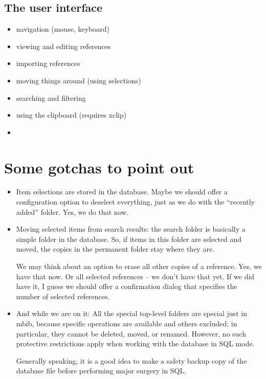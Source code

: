 \documentclass[10pt]{article}
\begin{document}
%
%


\subsection{The user interface}

\begin{itemize}
\item navigation (mouse, keyboard)
\item viewing and editing references
\item importing references
\item moving things around (using selections)
\item searching and filtering
\item using the clipboard (requires xclip)
\item 
\end{itemize}

\section*{Some gotchas to point out}

\begin{itemize}
\item Item selections are stored in the database. Maybe we should offer a configuration option to deselect everything, just as we do with the ``recently added'' folder. Yes, we do that now. 

\item Moving selected items from search results: the search folder is basically a simple folder in the database. So, if items in this folder are selected and moved, the copies in the permanent folder stay where they are. 

We may think about an option to erase all other copies of a reference. Yes, we have that now. Or all selected references -- we don't have that yet. If we did have it, I guess we should offer a confirmation dialog that specifies the number of selected references.

\item And while we are on it: All the special top-level folders are special just in mbib, because specific operations are available and others excluded; in particular, they cannot be deleted, moved, or renamed. However, no such protective restrictions apply when working with the database in SQL mode. 

Generally speaking, it is a good idea to make a safety backup copy of the database file before performing major surgery in SQL. 
\end{itemize}
\end{document}

